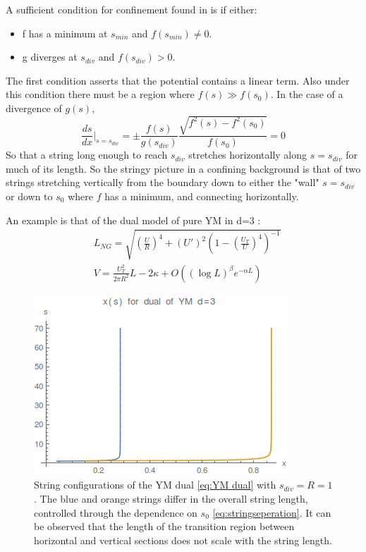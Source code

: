 \documentclass[11pt,a4paper]{article}
\begin{document}
A sufficient condition for confinement found in \cite{Sonnenschein00,Kinar98} is if either:
\begin{itemize}
\item f has a minimum at $s_{min}$ and $f\left(s_{min}\right)\neq0$.
\item g diverges at $s_{div}$ and $f\left(s_{div}\right)>0$.
\end{itemize}
The first condition asserts that the potential contains a linear term. Also under this condition there must be a region where $f\left(s\right)\gg f\left(s_0\right)$. In the case of a divergence of $g\left(s\right)$,
\begin{equation}
\frac{ds}{dx}|_{s=s_{div}}=\pm\frac{f\left(s\right)}{g\left(s_{div}\right)} \frac{\sqrt{f^2\left(s\right)-f^2\left(s_0\right)}}{f\left(s_0\right)}=0
\end{equation}
So that a string long enough to reach $s_{div}$ stretches horizontally along $s=s_{div}$ for much of its length. So the stringy picture in a confining background is that of two strings stretching vertically from the boundary down to either the "wall" $s=s_{div}$ or down to $s_0$ where $f$ has a minimum, and connecting horizontally.

An example is that of the dual model of pure YM in d=3 \cite{Kinar98}:
\begin{subequations}
\label{eq:YM dual}
\begin{align}
&L_{NG}=\sqrt{\left(\frac{U}{R}\right)^4+\left(U'\right)^2\left(1-\left(\frac{U_T}{U}\right)^4\right)^{-1}} \\
&V=\frac{U_T^2}{2\pi R^2}L-2\kappa+O\left(\left(\log L\right)^\beta e^{-\alpha L}\right)
\end{align}
\end{subequations}

\begin{figure}
\centering
\includegraphics[scale=0.7]{figures/stringConfiguration.png}
\caption{String configurations of the YM dual \ref{eq:YM dual} with $s_{div}=R=1$. The blue and orange strings differ in the overall string length, controlled through the dependence on $s_0$ \ref{eq:stringseperation}. It can be observed that the length of the transition region between horizontal and vertical sections does not scale with the string length.}
\end{figure}
\end{document}
